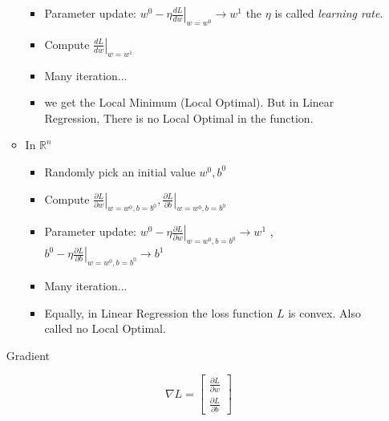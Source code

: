 \documentclass{article}
\newenvironment{propblock}[1][\textbf{Proposition}]{\begin{tcolorbox}
[title = \textbf{#1}, colback=Salmon!20, colframe=Salmon!90!Black]}{\end{tcolorbox}}
\begin{document}
\begin{enumerate}
\begin{propblock}[How To Use Gradient Descent]
\begin{itemize}
\begin{itemize}
                \item Parameter update: $w^0-\eta \left.\frac{d L}{d w}\right|_{w=w^{0}}\to w^1$ the $\eta$ is called \textit{learning rate}.
    
                \item Compute $\left.\frac{d L}{d w}\right|_{w=w^{1}}$
    
                \item Many iteration...
    
                \item we get the Local Minimum (Local Optimal). But in Linear Regression, There is no Local Optimal in the function.
            \end{itemize}
            
            \item In $\mathbb{R}^n$

            \begin{itemize}
                \item Randomly pick an initial value $w^0,b^0$
                
                \item Compute $\left.\frac{\partial L}{\partial w}\right|_{w=w^{0}, b=b^{0}},\left.\frac{\partial L}{\partial b}\right|_{w=w^{0}, b=b^{0}}$
    
                \item Parameter update: $w^0-\eta\left.\frac{\partial L}{\partial w}\right|_{w=w^{0}, b=b^{0}}\to w^1$ ,$b^0-\eta\left.\frac{\partial L}{\partial b}\right|_{w=w^{0}, b=b^{0}}\to b^1$ 
    
                \item Many iteration...
    
                \item Equally, in Linear Regression the loss function $L$ is convex. Also called no Local Optimal.
            \end{itemize}
        \end{itemize} 
    \end{propblock}

    \begin{tipsblock}{Gradient}
    
        $$
        \nabla L = \begin{bmatrix} \frac{\partial L}{\partial w} \\ \frac{\partial L}{\partial b}\end{bmatrix}
        $$
        

\end{tipsblock}
\end{enumerate}
\end{document}

